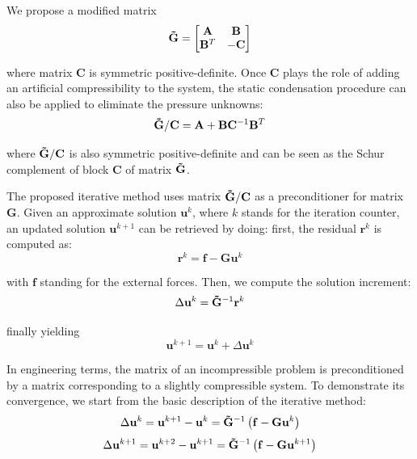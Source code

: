 \documentclass{wccm2024}
\begin{document}
We propose a modified matrix
\vskip -0.3cm
\begin{equation}
    \mathbf{\Tilde{G}} =
    \begin{bmatrix}
        \mathbf{A} & \mathbf{B} \\
        \mathbf{B}^T & -\mathbf{C}
    \end{bmatrix}
\end{equation}

\noindent where matrix $\mathbf{C}$ is symmetric positive-definite. Once $\mathbf{C}$ plays the role of adding an artificial compressibility to the system, the static condensation procedure can also be applied to eliminate the pressure unknowns:
\vskip -0.3cm
\begin{equation}
    \mathbf{\Tilde{G}} / \mathbf{C} = \mathbf{A} + \mathbf{B}\mathbf{C}^{-1}\mathbf{B}^T
\end{equation}

\noindent where $\mathbf{\Tilde{G}} / \mathbf{C}$ is also symmetric positive-definite and can be seen as the Schur complement of block $\mathbf{C}$ of matrix $\mathbf{\Tilde{G}}$.

The proposed iterative method uses matrix $\mathbf{\Tilde{G}} / \mathbf{C}$ as a preconditioner for matrix $\mathbf{G}$. Given an approximate solution $\mathbf{u}^k$, where $k$ stands for the iteration counter, an updated solution $\mathbf{u}^{k+1}$ can be retrieved by doing: first, the residual $\mathbf{r}^{k}$ is computed as:
\vskip -0.3cm
\begin{equation}
    \mathbf{r}^{k} = \mathbf{f} - \mathbf{G} \mathbf{u}^k
\end{equation}

\noindent with $\mathbf{f}$ standing for the external forces. Then, we compute the solution increment:
\vskip -0.3cm
\begin{equation}
    \Delta\mathbf{u}^{k} = \mathbf{\Tilde{G}}^{-1} \mathbf{r}^{k}
\end{equation}

\noindent finally yielding
\vskip -0.3cm
\begin{equation}
    \mathbf{u}^{k+1} = \mathbf{u}^{k} + \Delta\mathbf{u}^{k}
\end{equation}

In engineering terms, the matrix of an incompressible problem is preconditioned by a matrix corresponding to a slightly compressible system. To demonstrate its convergence, we start from the basic description of the iterative method:
\vskip -0.3cm
\begin{equation}
    \Delta\mathbf{u}^{k} = \mathbf{u}^{k+1} - \mathbf{u}^{k} = \mathbf{\Tilde{G}}^{-1} \left( \mathbf{f} - \mathbf{G} \mathbf{u}^k \right)
\end{equation}
\vskip -0.3cm
\begin{equation}
    \Delta\mathbf{u}^{k+1} = \mathbf{u}^{k+2} - \mathbf{u}^{k+1} = \mathbf{\Tilde{G}}^{-1} \left( \mathbf{f} - \mathbf{G} \mathbf{u}^{k+1} \right)
\end{equation}
\end{document}
